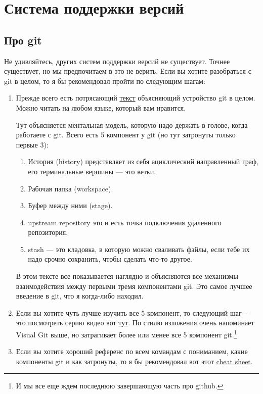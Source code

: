 \documentclass{article}
\begin{document}
\section{Система поддержки версий}

\subsection{Про git}

Не удивляйтесь, других систем поддержки версий не существует. Точнее существует, но мы предпочитаем в это не верить. Если вы хотите разобраться с git в целом, то я бы рекомендовал пройти по следующим шагам:
\begin{enumerate}
\item Прежде всего есть потрясающий \href{https://marklodato.github.io/visual-git-guide/index-en.html}{текст} объясняющий устройство git в целом. Можно читать на любом языке, который вам нравится.

Тут объясняется ментальная модель, которую надо держать в голове, когда работаете с git. Всего есть 5 компонент у git (но тут затронуты только первые 3):
\begin{enumerate}
\item История (history) представляет из себя ациклический направленный граф, его терминальные вершины — это ветки.
\item Рабочая папка (workspace).
\item Буфер между ними (stage).
\item upstream repository это и есть точка подключения удаленного репозитория.
\item stash — это кладовка, в которую можно сваливать файлы, если тебе их надо срочно сохранить, чтобы сделать что-то другое.
\end{enumerate}
В этом тексте все показывается наглядно и объясняются все механизмы взаимодействия между первыми тремя компонентами git. Это самое лучшее введение в git, что я когда-либо находил.

\item Если вы хотите чуть лучше изучить все 5 компонент, то следующий шаг -- это посмотреть серию видео вот \href{https://www.youtube.com/playlist?list=PL9ZoDZ0U4QLBhwg-wC5UU30vDG9-9geSe}{тут}. По стилю изложения очень напоминает Visual Git выше, но затрагивает более или менее все 5 компонент git.\footnote{И мы все еще ждем последнюю завершающую часть про github.}

\item Если вы хотите хороший референс по всем командам с пониманием, какие компоненты git и как затронуты, то я бы рекомендовал вот этот \href{http://www.ndpsoftware.com/git-cheatsheet.html#loc=workspace;}{cheat sheet}.


\end{enumerate}
\end{document}
